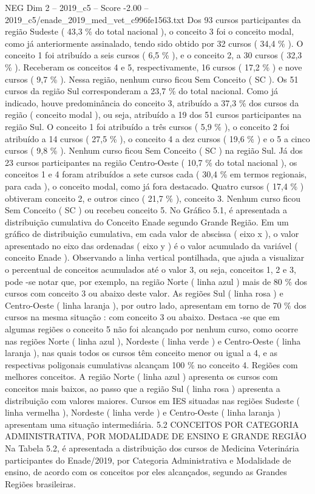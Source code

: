 \begin{textsample}{NEG Dim 2 – 2019\_c5 – Score -2.00 – 2019\_c5/enade\_2019\_med\_vet\_c996fe1563.txt}
Dos 93 cursos participantes da região Sudeste ( 43,3 \% do total nacional ), o conceito 3 foi o conceito modal, como já anteriormente assinalado, tendo sido obtido por 32 cursos ( 34,4 \% ).
O conceito 1 foi atribuído a seis cursos ( 6,5 \% ), e o conceito 2, a 30 cursos ( 32,3 \% ).
Receberam os conceitos 4 e 5, respectivamente, 16 cursos ( 17,2 \% ) e nove cursos ( 9,7 \% ).
Nessa região, nenhum curso ficou Sem Conceito ( SC ).
Os 51 cursos da região Sul corresponderam a 23,7 \% do total nacional.
Como já indicado, houve predominância do conceito 3, atribuído a 37,3 \% dos cursos da região ( conceito modal ), ou seja, atribuído a 19 dos 51 cursos participantes na região Sul.
O conceito 1 foi atribuído a três cursos ( 5,9 \% ), o conceito 2 foi atribuído a 14 cursos ( 27,5 \% ), o conceito 4 a dez cursos ( 19,6 \% ) e o 5 a cinco cursos ( 9,8 \% ).
Nenhum curso ficou Sem Conceito ( SC ) na região Sul.
Já dos 23 cursos participantes na região Centro-Oeste ( 10,7 \% do total nacional ), os conceitos 1 e 4 foram atribuídos a sete cursos cada ( 30,4 \% em termos regionais, para cada ), o conceito modal, como já fora destacado.
Quatro cursos ( 17,4 \% ) obtiveram conceito 2, e outros cinco ( 21,7 \% ), conceito 3.
Nenhum curso ficou Sem Conceito ( SC ) ou recebeu conceito 5.
No Gráfico 5.1, é apresentada a distribuição cumulativa do Conceito Enade segundo Grande Região.
Em um gráfico de distribuição cumulativa, em cada valor de abscissa ( eixo x ), o valor apresentado no eixo das ordenadas ( eixo y ) é o valor acumulado da variável ( conceito Enade ).
Observando a linha vertical pontilhada, que ajuda a visualizar o percentual de conceitos acumulados até o valor 3, ou seja, conceitos 1, 2 e 3, pode -se notar que, por exemplo, na região Norte ( linha azul ) mais de 80 \% dos cursos com conceito 3 ou abaixo deste valor.
As regiões Sul ( linha rosa ) e Centro-Oeste ( linha laranja ), por outro lado, apresentam em torno de 70 \% dos cursos na mesma situação : com conceito 3 ou abaixo.
Destaca -se que em algumas regiões o conceito 5 não foi alcançado por nenhum curso, como ocorre nas regiões Norte ( linha azul ), Nordeste ( linha verde ) e Centro-Oeste ( linha laranja ), nas quais todos os cursos têm conceito menor ou igual a 4, e as respectivas poligonais cumulativas alcançam 100 \% no conceito 4.
Regiões com melhores conceitos.
A região Norte ( linha azul ) apresenta os cursos com conceitos mais baixos, ao passo que a região Sul ( linha rosa ) apresenta a distribuição com valores maiores.
Cursos em IES situadas nas regiões Sudeste ( linha vermelha ), Nordeste ( linha verde ) e Centro-Oeste ( linha laranja ) apresentam uma situação intermediária. 5.2 CONCEITOS POR CATEGORIA ADMINISTRATIVA, POR MODALIDADE DE ENSINO E GRANDE REGIÃO Na Tabela 5.2, é apresentada a distribuição dos cursos de Medicina Veterinária participantes do Enade/2019, por Categoria Administrativa e Modalidade de ensino, de acordo com os conceitos por eles alcançados, segundo as Grandes Regiões brasileiras.

\end{textsample}
